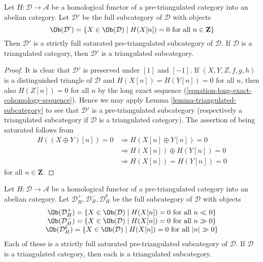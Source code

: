 \begin{lemma}
\label{lemma-homological-functor-kernel}
Let $H : \mathcal{D} \to \mathcal{A}$ be a homological functor of
a pre-triangulated category into an abelian category.
Let $\mathcal{D}'$ be the full subcategory of $\mathcal{D}$ with objects
$$
\Ob(\mathcal{D}') =
\{X \in \Ob(\mathcal{D}) \mid
H(X[n]) = 0\text{ for all }n \in \mathbf{Z}\}
$$
Then $\mathcal{D}'$ is a strictly full saturated pre-triangulated subcategory
of $\mathcal{D}$. If $\mathcal{D}$ is a triangulated category, then
$\mathcal{D}'$ is a triangulated subcategory.
\end{lemma}

\begin{proof}
It is clear that $\mathcal{D}'$ is preserved under $[1]$ and $[-1]$.
If $(X, Y, Z, f, g, h)$ is a distinguished triangle of $\mathcal{D}$
and $H(X[n]) = H(Y[n]) = 0$ for all $n$, then also $H(Z[n]) = 0$ for all $n$
by the long exact sequence (\ref{equation-long-exact-cohomology-sequence}).
Hence we may apply
Lemma \ref{lemma-triangulated-subcategory}
to see that $\mathcal{D}'$ is a pre-triangulated subcategory (respectively
a triangulated subcategory if $\mathcal{D}$ is a triangulated category).
The assertion of being saturated follows from
\begin{align*}
H((X \oplus Y)[n]) = 0 & \Rightarrow H(X[n] \oplus Y[n]) = 0 \\
& \Rightarrow H(X[n]) \oplus H(Y[n]) = 0 \\
& \Rightarrow H(X[n]) = H(Y[n]) = 0
\end{align*}
for all $n \in \mathbf{Z}$.
\end{proof}

\begin{lemma}
\label{lemma-homological-functor-bounded}
Let $H : \mathcal{D} \to \mathcal{A}$ be a homological functor of
a pre-triangulated category into an abelian category.
Let $\mathcal{D}_H^{+}, \mathcal{D}_H^{-}, \mathcal{D}_H^b$
be the full subcategory of $\mathcal{D}$ with objects
$$
\begin{matrix}
\Ob(\mathcal{D}_H^{+}) =
\{X \in \Ob(\mathcal{D}) \mid
H(X[n]) = 0\text{ for all }n \ll 0\} \\
\Ob(\mathcal{D}_H^{-}) =
\{X \in \Ob(\mathcal{D}) \mid
H(X[n]) = 0\text{ for all }n \gg 0\} \\
\Ob(\mathcal{D}_H^b) =
\{X \in \Ob(\mathcal{D}) \mid
H(X[n]) = 0\text{ for all }|n| \gg 0\}
\end{matrix}
$$
Each of these is a strictly full saturated pre-triangulated subcategory
of $\mathcal{D}$. If $\mathcal{D}$ is a triangulated category, then
each is a triangulated subcategory.
\end{lemma}

